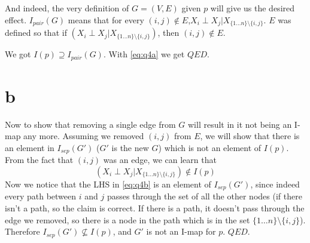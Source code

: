 \documentclass[11pt]{article}
\begin{document}
And indeed, the very definition of $G=(V,E)$ given $p$ will give us the desired effect.
$I_{pair}(G)$ means that for every $(i,j)\notin E$,$X_i\perp X_j | X_{\{1\dots n\}\setminus\{i,j\}}$.
$E$ was defined so that if $\left(X_i\perp X_j | X_{\{1\dots n\}\setminus\{i,j\}}\right)$, then $(i,j)\notin E$.

We got $I(p) \supseteq I_{pair}(G)$. With \eqref{eq:q4a} we get $QED$.

\section*{b}
Now to show that removing a single edge from $G$ will result in it not being an I-map any more. Assuming we removed $(i,j)$ from $E$, we will show that there is an element in $I_{sep}(G')$ ($G'$ is the new $G$) which is not an element of $I(p)$. From the fact that $(i,j)$ was an edge, we can learn that
\begin{equation}\label{eq:q4b}
\left(X_i\perp X_j | X_{\{1\dots n\}\setminus\{i,j\}}\right)\notin I(p)
\end{equation}
Now we notice that the LHS in \eqref{eq:q4b} is an element of $I_{sep}(G')$, since indeed every path between $i$ and $j$ passes through the set of all the other nodes (if there isn't a path, so the claim is correct. If there is a path, it doesn't pass through the edge we removed, so there is a node in the path which is in the set $\{1\dots n\}\setminus\{i,j\}$).
Therefore $I_{sep}(G') \not\subseteq I(p)$, and $G'$ is not an I-map for $p$. $QED$. 
\end{document}
